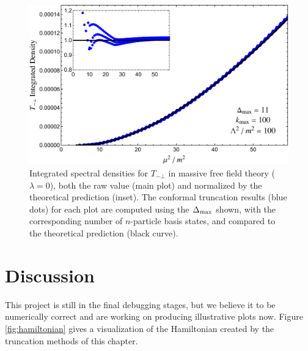 \begin{figure}[t!]
\begin{center}
\includegraphics[width=\textwidth]{truncation_chapter/Tmp}
\caption{Integrated spectral densities for $T_{-\bot}$ in massive free field theory ($\lambda=0$), both the raw value (main plot) and normalized by the theoretical prediction (inset). The conformal truncation results (blue dots) for each plot are computed using the $\Delta_{\max}$ shown, with the corresponding number of $n$-particle basis states, and compared to the theoretical prediction (black curve).}
\label{fig:FreeDensitiesTmp} 
\end{center}
\end{figure}

\section{Discussion}
\label{sec:Discussion}

This project is still in the final debugging stages, but we believe it to be
numerically correct and are working on producing illustrative plots now. Figure
\ref{fig:hamiltonian} gives a visualization of the Hamiltonian created by the 
truncation methods of this chapter.

